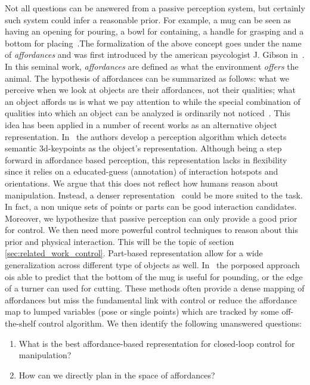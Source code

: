Not all questions can be answered from a passive perception system, but certainly such system could infer a reasonable prior. For example, a mug can be seen as having an opening for pouring, a bowl for containing, a handle for grasping and a bottom for placing~\cite{fagg1998modeling}.The formalization of the above concept goes under the name of \emph{affordances} and was first introduced by the american psycologist J. Gibson in~\cite{gibson1977theory}. In this seminal work, \emph{affordances} are defined as what the environment \emph{offers} the animal. The hypothesis of affordances can be summarized as follows: what we perceive when we look at objects are their affordances, not their qualities; what an object affords us is what we pay attention to while the special combination of qualities into which an object can be analyzed is ordinarily not noticed~\cite{gibson1977theory}. This idea has been applied in a number of recent works as an alternative object representation. In~\cite{gao2021kpam} the authors develop a perception algorithm which detects semantic 3d-keypoints as the object's representation. Although being a step forward in affordance based perception, this representation lacks in flexibility since it relies on a educated-guess (annotation) of interaction hotspots and orientations. We argue that this does not reflect how humans reason about manipulation. Instead, a denser representation~\cite{nagarajan2019grounded, mo2021where2act} could be more suited to the task. In fact, a non unique sets of points or parts can be good interaction candidates. Moreover, we hypothesize that passive perception can only provide a good prior for control. We then need more powerful control techniques to reason about this prior and physical interaction. This will be the topic of section \ref{sec:related_work_control}. Part-based representation allow for a wide generalization across different type of objects as well. In~\cite{myers2015affordance} the porposed approach ois able to predict that the bottom of the mug is useful for pounding, or the edge of a turner can used for cutting. These methods often provide a dense mapping of affordances but miss the fundamental link with control or reduce the affordance map to lumped variables (pose or single points) which are tracked by some off-the-shelf control algorithm. We then identify the following unanswered questions:
\begin{enumerate}
\item What is the best affordance-based representation for closed-loop control for manipulation? 
\item How can we directly plan in the space of affordances?
\end{enumerate} 
 


